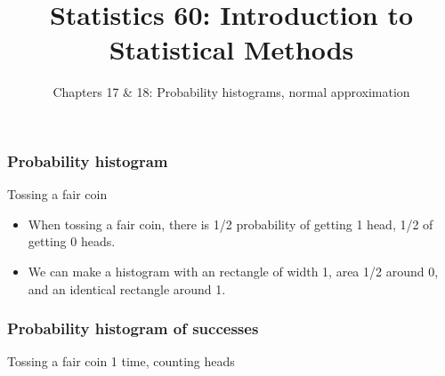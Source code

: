\documentclass[handout]{beamer}
\title{Statistics 60: Introduction to Statistical Methods}
\subtitle{Chapters 17 \& 18: Probability histograms, normal approximation}
\author{}%
\begin{document}
   \begin{frame}
   \titlepage
   \end{frame}


   \begin{frame} \frametitle{Probability histogram}

   \begin{block}
     {Tossing a fair coin}
     \begin{itemize}
     \item When tossing a fair coin, there is 1/2 probability of getting
       1 head, 1/2 of getting 0 heads.

       \item We can make a histogram with an rectangle of width 1,
         area 1/2 around 0, and an identical rectangle around 1.
     \end{itemize}
   \end{block}
   \end{frame}



   \begin{frame}
   \frametitle{Probability histogram of successes}
   \begin{center}
   \end{center}
   Tossing a fair coin 1 time, counting heads
   \end{frame}

\end{document}
